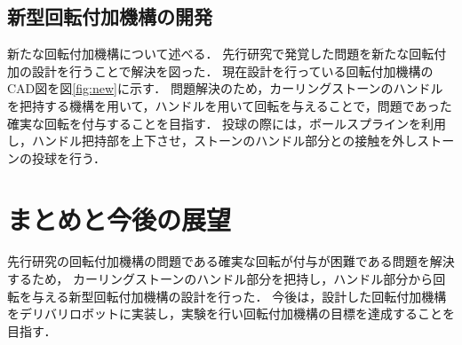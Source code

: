 \documentclass{classes/sice-si}
\begin{document}
\subsection{新型回転付加機構の開発}
新たな回転付加機構について述べる．
先行研究で発覚した問題を新たな回転付加の設計を行うことで解決を図った．
現在設計を行っている回転付加機構のCAD図を図\ref{fig:new}に示す．
問題解決のため，カーリングストーンのハンドルを把持する機構を用いて，ハンドルを用いて回転を与えることで，問題であった確実な回転を付与することを目指す．
投球の際には，ボールスプラインを利用し，ハンドル把持部を上下させ，ストーンのハンドル部分との接触を外しストーンの投球を行う．


\section{まとめと今後の展望}
先行研究の回転付加機構の問題である確実な回転が付与が困難である問題を解決するため，
カーリングストーンのハンドル部分を把持し，ハンドル部分から回転を与える新型回転付加機構の設計を行った．
今後は，設計した回転付加機構をデリバリロボットに実装し，実験を行い回転付加機構の目標を達成することを目指す．



\printbibliography[title=参考文献]
\end{document}
